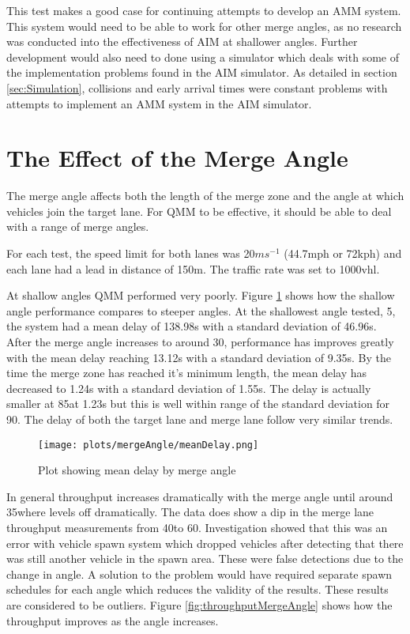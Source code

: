 This test makes a good case for continuing attempts to develop an AMM system. This system would need to be able to work for other merge angles, as no research was conducted into the effectiveness of AIM at shallower angles. Further development would also need to done using a simulator which deals with some of the implementation problems found in the AIM simulator. As detailed in section \ref{sec:Simulation}, collisions and early arrival times were constant problems with attempts to implement an AMM system in the AIM simulator.

\section{The Effect of the Merge Angle}
\label{sec:The Effect of the Merge Angle}
The merge angle affects both the length of the merge zone and the angle at which vehicles join the target lane. For QMM to be effective, it should be able to deal with a range of merge angles.

For each test, the speed limit for both lanes was 20$\si{ms^{-1}}$ (44.7\si{mph} or 72\si{kph}) and each lane had a lead in distance of 150\si{m}. The traffic rate was set to 1000\si{vhl}.

At shallow angles QMM performed very poorly. Figure \ref{fig:meanDelayMergeAngle} shows how the shallow angle performance compares to steeper angles. At the shallowest angle tested, 5\degree, the system had a mean delay of 138.98\si{s} with a standard deviation of 46.96\si{s}. After the merge angle increases to around 30\degree, performance has improves greatly with the mean delay reaching 13.12\si{s} with a standard deviation of 9.35\si{s}. By the time the merge zone has reached it's minimum length, the mean delay has decreased to 1.24\si{s} with a standard deviation of 1.55\si{s}. The delay is actually smaller at 85\degree at 1.23\si{s} but this is well within range of the standard deviation for 90\degree. The delay of both the target lane and merge lane follow very similar trends. 

\begin{figure}[htb]
\centering
\texttt{[image: plots/mergeAngle/meanDelay.png]}
\caption{Plot showing mean delay by merge angle}
\label{fig:meanDelayMergeAngle}
\end{figure}

In general throughput increases dramatically with the merge angle until around 35\degree where levels off dramatically. The data does show a dip in the merge lane throughput measurements from 40\degree to 60\degree. Investigation showed that this was an error with vehicle spawn system which dropped vehicles after detecting that there was still another vehicle in the spawn area. These were false detections due to the change in angle. A solution to the problem would have required separate spawn schedules for each angle which reduces the validity of the results. These results are considered to be outliers. Figure \ref{fig:throughputMergeAngle} shows how the throughput improves as the angle increases.

